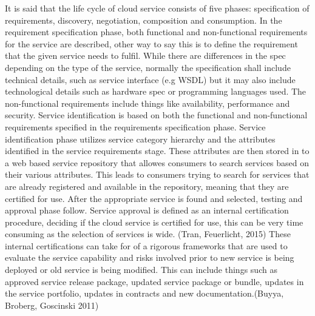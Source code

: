 \documentclass{article}
\begin{document}
It is said that the life cycle of cloud service consists of five phases: specification of requirements, discovery, negotiation, composition and consumption. In the requirement specification phase, both functional and non-functional requirements for the service are described, other way to say this is to define the requirement that the given service needs to fulfil. While there are differences in the spec depending on the type of the service, normally the specification shall include technical details, such as service interface (e.g WSDL) but it may also include technological details such as hardware spec or programming languages used. The non-functional requirements include things like availability, performance and security. Service identification is based on both the functional and non-functional requirements specified in the requirements specification phase. Service identification phase utilizes service category hierarchy and the attributes identified in the service requirements stage. These attributes are then stored in to a web based service repository that allowes consumers to search services based on their various attributes. This leads to consumers trying to search for services that are already registered and available in the repository, meaning that they are certified for use. After the appropriate service is found and selected, testing and approval phase follow. Service approval is defined as an internal certification procedure, deciding if the cloud service is certified for use, this can be very time consuming as the selection of services is wide. (Tran, Feuerlicht, 2015) These internal certifications can take for of a rigorous frameworks that are used to evaluate the service capability and risks involved prior to new service is being deployed or old service is being modified. This can include things such as approved service release package, updated service package or bundle, updates in the service portfolio, updates in contracts and new documentation.(Buyya, Broberg, Goscinski 2011) 
\par
\end{document}

